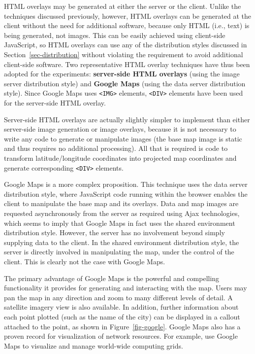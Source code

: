 \documentclass[acmnow]{acmtrans2m}
\begin{document}
HTML overlays may be generated at either the server or the client.
Unlike the techniques discussed previously, however, HTML overlays can
be generated at the client without the need for additional software,
because only HTML (i.e., text) is being generated, not images. This can
be easily achieved using client-side JavaScript, so HTML overlays can
use any of the distribution styles discussed in
Section~\ref{sec-distribution} without violating the requirement to
avoid additional client-side software. Two representative HTML overlay
techniques have thus been adopted for the experiments:
\textbf{server-side HTML overlays} (using the image server distribution
style) and \textbf{Google Maps} (using the data server distribution
style). Since Google Maps uses \verb|<IMG>| elements, \verb|<DIV>|
elements have been used for the server-side HTML overlay.

Server-side HTML overlays are actually slightly simpler to implement
than either server-side image generation or image overlays, because it
is not necessary to write any code to generate or manipulate images (the
base map image is static and thus requires no additional processing).
All that is required is code to transform latitude/longitude coordinates
into projected map coordinates and generate corresponding \verb|<DIV>|
elements.

Google Maps \cite{Goog-M-2006-maps} is a more complex proposition. This
technique uses the data server distribution style, where JavaScript code
running within the browser enables the client to manipulate the base map
and its overlays. Data and map images are requested asynchronously from
the server as required using Ajax technologies, which seems to imply
that Google Maps in fact uses the shared environment distribution style.
However, the server has no involvement beyond simply supplying data to
the client. In the shared environment distribution style, the server is
directly involved in manipulating the map, under the control of the
client. This is clearly not the case with Google Maps.

The primary advantage of Google Maps is the powerful and compelling
functionality it provides for generating and interacting with the map.
Users may pan the map in any direction and zoom to many different levels
of detail. A satellite imagery view is also available. In addition,
further information about each point plotted (such as the name of the
city) can be displayed in a callout attached to the point, as shown in
Figure~\ref{fig-google}. Google Maps also has a proven record for
visualization of network resources. For example,
 use Google Maps to visualize and manage
world-wide computing grids.
\end{document}
